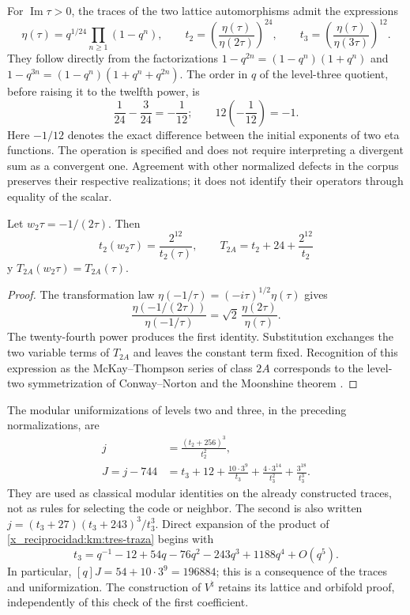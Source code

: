 For \(\operatorname{Im}\tau>0\), the traces of the two lattice
automorphisms admit the expressions
\begin{equation}
 \eta(\tau)=q^{1/24}\prod_{n\ge1}(1-q^n),\qquad
 t_2=\left(\frac{\eta(\tau)}{\eta(2\tau)}\right)^{24},\qquad
 t_3=\left(\frac{\eta(\tau)}{\eta(3\tau)}\right)^{12}.
 \label{x_reciprocidad:km:eta-trazas}
\end{equation}
They follow directly from the factorizations
\(1-q^{2n}=(1-q^n)(1+q^n)\) and
\(1-q^{3n}=(1-q^n)(1+q^n+q^{2n})\). The order in \(q\) of the
level-three quotient, before raising it to the twelfth power, is
\[
 \frac1{24}-\frac3{24}=-\frac1{12};
 \qquad 12\left(-\frac1{12}\right)=-1.
\]
Here \(-1/12\) denotes the exact difference between the initial
exponents of two eta functions. The operation is specified and
does not require interpreting a divergent sum as a convergent one.
Agreement with other normalized defects in the corpus preserves
their respective realizations; it does not identify their operators
through equality of the scalar.

\begin{proposition}
\label{x_reciprocidad:km:fricke-prop}
Let \(w_2\tau=-1/(2\tau)\). Then
\begin{equation}
 t_2(w_2\tau)=\frac{2^{12}}{t_2(\tau)},\qquad
 T_{2A}=t_2+24+\frac{2^{12}}{t_2}
 \label{x_reciprocidad:km:fricke-t2}
\end{equation}
y \(T_{2A}(w_2\tau)=T_{2A}(\tau)\).
\end{proposition}
\begin{proof}
The transformation law
\(\eta(-1/\tau)=(-i\tau)^{1/2}\eta(\tau)\) gives
\[
 \frac{\eta(-1/(2\tau))}{\eta(-1/\tau)}
 =\sqrt2\,\frac{\eta(2\tau)}{\eta(\tau)}.
\]
The twenty-fourth power produces the first identity. Substitution
exchanges the two variable terms of \(T_{2A}\) and leaves the
constant term fixed. Recognition of this expression as the
McKay--Thompson series of class \(2A\) corresponds to the
level-two symmetrization of Conway--Norton
\cite[\S\S4 y 6, tabla~3]{x_reciprocidad:kmconwaynorton1979} and the
Moonshine theorem \cite{x_reciprocidad:borcherds}.
\end{proof}

The modular uniformizations of levels two and three, in the
preceding normalizations, are
\begin{align}
 j&=\frac{(t_2+256)^3}{t_2^2},
 \label{x_reciprocidad:km:j-nivel2}\\
 J=j-744
 &=t_3+12+\frac{10\cdot3^9}{t_3}
       +\frac{4\cdot3^{14}}{t_3^2}
       +\frac{3^{18}}{t_3^3}.
 \label{x_reciprocidad:km:j-nivel3}
\end{align}
They are used as classical modular identities on the already
constructed traces, not as rules for selecting the code or neighbor.
The second is also written
\(j=(t_3+27)(t_3+243)^3/t_3^3\).
Direct expansion of the product of \eqref{x_reciprocidad:km:tres-traza} begins with
\[
 t_3=q^{-1}-12+54q-76q^2-243q^3+1188q^4+O(q^5).
\]
In particular, \([q]J=54+10\cdot3^9=196884\); this is a
consequence of the traces and uniformization. The construction of
\(V^\natural\) retains its lattice and orbifold proof,
independently of this check of the first coefficient.

